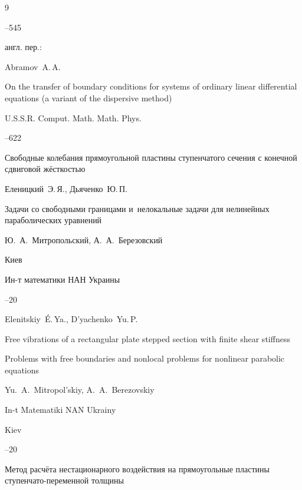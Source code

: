 \begin{thebibliography}{9}


--545

\transl англ. пер.:~

\by Abramov~A.\,A.

\paper On the transfer of boundary conditions for systems of ordinary linear differential equations (a variant of the dispersive method)

\jour U.S.S.R. Comput. Math. Math. Phys. 



--622











\paper Свободные колебания прямоугольной пластины ступенчатого сечения с конечной сдвиговой жёсткостью

\by Еленицкий~Э.\,Я., Дьяченко~Ю.\,П.

\inbook Задачи со свободными границами и~нелокальные задачи для нелинейных параболических уравнений

\eds Ю.~А.~Митропольский, А.~А.~Березовский

\publaddr Киев

\publ Ин-т математики НАН Украины


--20

\misctransl

\by Elenitskiy~\'E.\,Ya., D'yachenko~Yu.\,P.

\paper Free vibrations of a rectangular plate stepped section with finite shear stiffness

\inbook Problems with free boundaries and nonlocal problems for nonlinear parabolic equations

\eds Yu.~A.~Mitropol'skiy, A.~A.~Berezovskiy

\publ In-t Matematiki NAN Ukrainy

\publaddr Kiev


--20




\paper Метод расчёта нестационарного воздействия на прямоугольные пластины ступенчато-переменной толщины


\end{thebibliography}
